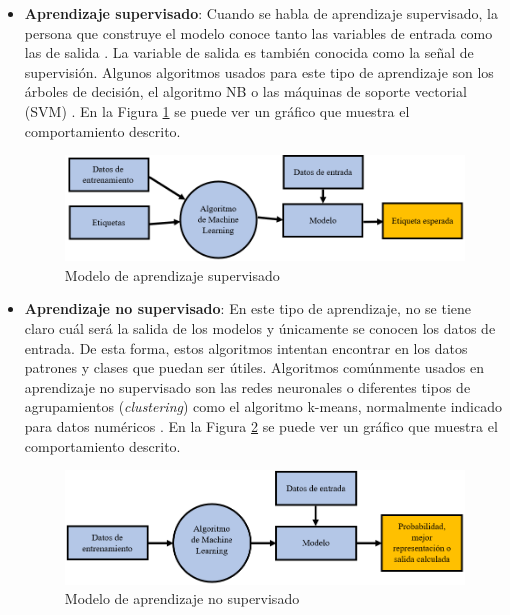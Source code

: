 \begin{itemize}

    \item \textbf{Aprendizaje supervisado}: Cuando se habla de aprendizaje supervisado, la persona que construye el modelo conoce tanto las variables de entrada como las de salida \cite{MML2018}. La variable de salida es también conocida como la señal de supervisión. Algunos algoritmos usados para este tipo de aprendizaje son los árboles de decisión, el algoritmo \gls{NB} o las máquinas de soporte vectorial (\gls{SVM}) \cite{Thomas_2020}. En la Figura \ref{fig:supervisado} se puede ver un gráfico que muestra el comportamiento descrito.
    
    \begin{figure}[htb]
    \begin{center}
    \includegraphics[width=0.80\linewidth]{images/supervisado.PNG}
    \end{center}
    \caption{Modelo de aprendizaje supervisado}
    \label{fig:supervisado}
    \end{figure}
    
    \item \textbf{Aprendizaje no supervisado}: En este tipo de aprendizaje, no se tiene claro cuál será la salida de los modelos \cite{MML2018} y únicamente se conocen los datos de entrada. De esta forma, estos algoritmos intentan encontrar en los datos patrones y clases que puedan ser útiles. Algoritmos comúnmente usados en aprendizaje no supervisado son las redes neuronales o diferentes tipos de agrupamientos (\textit{clustering}) como el algoritmo k-means, normalmente indicado para datos numéricos \cite{Thomas_2020}. En la Figura \ref{fig:nosupervisado} se puede ver un gráfico que muestra el comportamiento descrito.
    
    \begin{figure}[htb]
    \begin{center}
    \includegraphics[width=0.80\linewidth]{images/nosupervisado.PNG}
    \end{center}
    \caption{Modelo de aprendizaje no supervisado}
    \label{fig:nosupervisado}
    \end{figure}
    

\end{itemize}
